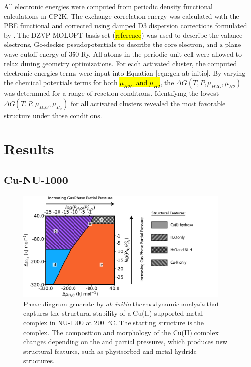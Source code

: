 \documentclass[journal=jctcce,manuscript=article]{achemso}
\begin{document}
All electronic energies were computed from periodic density functional calculations in CP2K.\cite{Hutter2014} The exchange correlation energy was calculated with the PBE functional\cite{Perdew1996} and corrected using damped D3 dispersion corrections formulated by \citeauthor{Grimme2010}.\cite{Grimme2010} The DZVP-MOLOPT basis set (\hl{reference}) was used to describe the valance electrons, Goedecker pseudopotentials\cite{Goedecker1996} to describe the core electron, and a plane wave cutoff energy of 360 Ry. All atoms in the periodic unit cell were allowed to relax during geometry optimizations. For each activated cluster, the computed electronic energies terms were input into Equation \ref{eqn:gen-ab-initio}. By varying the chemical potentials terms for both \hl{$\mu_{H2O}$ and $\mu_{H2}$}, the $\Delta G(T,P,\mu_{H2O},\mu_{H2})$ was determined for a range of reaction conditions. Identifying the lowest $\Delta G(T,P,\mu_{H_{2}O},\mu_{H_{2}})$ for all activated clusters revealed the most favorable structure under those conditions.  

\newpage
\section{Results}
\subsection{Cu-NU-1000}

\begin{figure}[H]
    \centering
    \includegraphics[width=0.95\textwidth]{zi-images/02-Cu-Graphics/2020-08-05-Cu3-phase-diagram-V01.png}
    \caption{Phase diagram generate by \textit{ab initio} thermodynamic analysis that captures the structural stability of a Cu(II) supported metal complex in NU-1000 at \SI{200}{\celsius}. The starting structure is the  complex. The composition and morphology of the Cu(II) complex changes depending on the  and  partial pressures, which produces new structural features, such as physisorbed  and metal hydride structures.}
    \label{fig:phasediagramCu3}
\end{figure}
\end{document}

